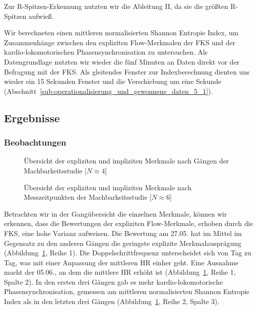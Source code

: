 Zur R-Spitzen-Erkennung nutzten wir die Ableitung II, da sie die größten R-Spitzen aufwieß. 

Wir berechneten einen mittleren normalisierten Shannon Entropie Index, um Zusammenhänge zwischen den expliziten Flow-Merkmalen der \ac{FKS} und der kardio-lokomotorischen Phasensynchronisation zu untersuchen. Als Datengrundlage nutzten wir wieder die fünf Minuten an Daten direkt vor der Befragung mit der \ac{FKS}. Als gleitendes Fenster zur Indexberechnung dienten uns wieder ein 15 Sekunden Fenster und die Verschiebung um eine Sekunde (Abschnitt~\ref{sub:operationalisierung_und_gewonnene_daten_5_1}).

\subsection{Ergebnisse} 

\label{sub:ergebnisse_5_2}

\subsubsection{Beobachtungen} 

\label{ssub:beobachtungen_5_2} 
\begin{figure}
	[!htb]  \caption[Übersicht der expliziten und impliziten Merkmale nach Gängen (Machbarkeitsstudie: Gehen)]{Übersicht der expliziten und impliziten Merkmale nach Gängen der Machbarkeitsstudie [$N \approx 4$]} \label{fig:ubersicht_nach_gangen_2} 
\end{figure}
\begin{figure}
	[!htb]  \caption[Übersicht der expliziten und impliziten Merkmale nach Messzeitpunkten (Machbarkeitsstudie: Gehen)]{Übersicht der expliziten und impliziten Merkmale nach Messzeitpunkten der Machbarkeitsstudie [$N \approx 6$]} \label{fig:ubersicht_nach_messzeitpunkten_2} 
\end{figure}

Betrachten wir in der Gangübersicht die einzelnen Merkmale, können wir erkennen, dass die Bewertungen der expliziten Flow-Merkmale, erhoben durch die \ac{FKS}, eine hohe Varianz aufweisen. Die Bewertung am 27.05. hat im Mittel im Gegensatz zu den anderen Gängen die geringste explizite Merkmalausprägung (Abbildung~\ref{fig:ubersicht_nach_gangen_2}, Reihe 1). Die Doppelschrittfrequenz unterscheidet sich von Tag zu Tag, was mit einer Anpassung der mittleren \ac{HR} einher geht. Eine Ausnahme macht der 05.06., an dem die mittlere \ac{HR} erhöht ist (Abbildung~\ref{fig:ubersicht_nach_gangen_2}, Reihe 1, Spalte 2). In den ersten drei Gängen gab es mehr kardio-lokomotorische Phasensynchronisation, gemessen am mittleren normalisierten Shannon Entropie Index als in den letzten drei Gängen (Abbildung~\ref{fig:ubersicht_nach_gangen_2}, Reihe 2, Spalte 3).

